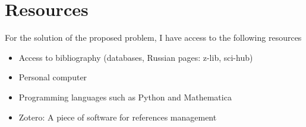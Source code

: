 \chapter{Resources}

For the solution of the proposed problem, I have access to the following resources 

\begin{itemize}
    \item Access to bibliography (databases, Russian pages: z-lib, sci-hub)
    \item Personal computer
    \item Programming languages such as Python and Mathematica
    \item Zotero: A piece of software for references management
\end{itemize}
